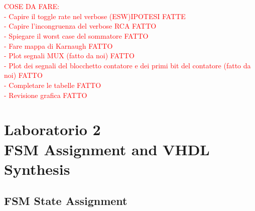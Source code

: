 \documentclass[11pt,  english, makeidx, a4paper, titlepage, oneside]{book}
\begin{document}
\\\\
\textcolor{red}{COSE DA FARE: \\
                 - Capire il toggle rate nel verbose (ESW)IPOTESI FATTE  \\
                 - Capire l'incongruenza del verbose RCA FATTO \\
                 - Spiegare il worst case del sommatore FATTO \\
                 - Fare mappa di Karnaugh FATTO \\
                 - Plot segnali MUX (fatto da noi) FATTO \\
                 - Plot dei segnali del blocchetto contatore e dei primi bit del contatore (fatto da noi) FATTO\\
                 - Completare le tabelle FATTO\\
                - Revisione grafica FATTO }  
\newpage
\chapter{Laboratorio 2 \\
FSM Assignment and VHDL Synthesis}    
\section{FSM State Assignment}
\end{document}
